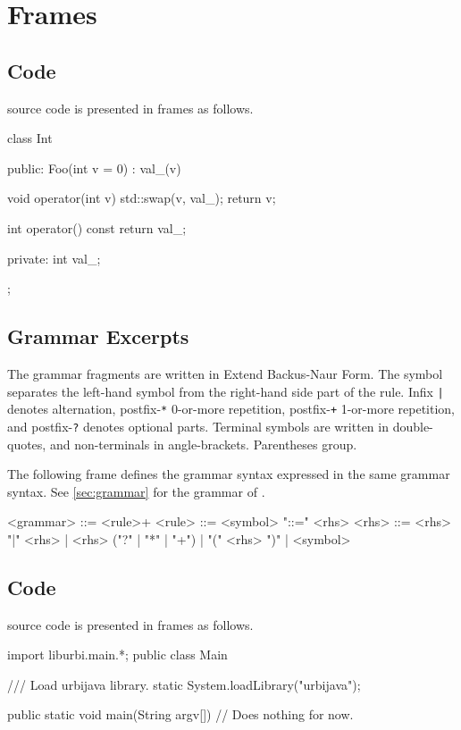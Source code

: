 \section{Frames}

\subsection{\Cxx Code}
\label{sec:notations:cxx}

\Cxx source code is presented in frames as follows.

\begin{cxx}
class Int
{
public:
  Foo(int v = 0)
    : val_(v)
  {}

  void operator(int v)
  {
    std::swap(v, val_);
    return v;
  }

  int operator() const
  {
    return val_;
  }

private:
  int val_;
};
\end{cxx}

\subsection{Grammar Excerpts}
\label{sec:notations:bnf}

The grammar fragments are written in Extend Backus-Naur Form.  The symbol
\lstindex{::=} separates the left-hand symbol from the right-hand side part
of the rule.  Infix \lstinline{|} denotes alternation, postfix-\lstinline{*}
0-or-more repetition, postfix-\lstinline{+} 1-or-more repetition, and
postfix-\lstinline{?} denotes optional parts.  Terminal symbols are written
in double-quotes, and non-terminals in angle-brackets.  Parentheses group.

The following frame defines the grammar syntax expressed in the same grammar
syntax.  See \autoref{sec:grammar} for the grammar of \us.
\begin{bnf}
<grammar> ::= <rule>+
<rule> ::= <symbol> "::=" <rhs>
<rhs> ::= <rhs> "|" <rhs>
        | <rhs> ("?" | "*" | "+")
        | "(" <rhs> ")"
        | <symbol>
\end{bnf}

\subsection{\Java Code}
\label{sec:notations:java}

\Java source code is presented in frames as follows.

\begin{java}
import liburbi.main.*;
public class Main
{
    /// Load urbijava library.
    static
    {
        System.loadLibrary("urbijava");
    }

    public static void main(String argv[])
    {
      // Does nothing for now.
    }
}
\end{java}

